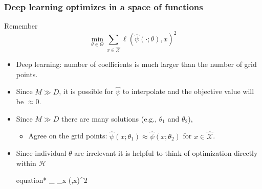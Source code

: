 \documentclass[aspectratio=169,10pt]{beamer}
\newcommand{\Xdom}{\mathcal{X}}
\newcommand{\Xtrain}{\hat{\mathcal{X}}}
\begin{document}
\begin{frame}
	\frametitle{Deep learning optimizes in a space of functions}
		Remember 
	$$
	\min_{\theta \in \Theta} \sum_{x \in \Xtrain} \ell(\hat{\psi}(\cdot;\theta),x)^2
	$$
	\begin{itemize}
		\item Deep learning: number of coefficients is much larger than the number of grid points.\vspace{0.1in} 
		\item Since $M \gg D$, it is possible for $\hat{\psi}$ to interpolate and the objective value will be $\approx 0$.
		\vspace{0.1in}
		\item Since $M \gg D$ there are many solutions (e.g., $\theta_1$ and $\theta_2$),\vspace{0.1in}
		\begin{itemize}
			\item Agree on the grid points: $\hat{\psi}(x;\theta_1) \approx \hat{\psi}(x;\theta_2)$ for $x \in \Xtrain$.\smallskip
		\end{itemize}
		\medskip
		\item Since individual $\theta$ are irrelevant it is helpful to think of optimization directly within $\mathcal{H}$
		\begin{empheq}[box=\tcbhighmath]{equation*}
			\min_{\hat{\psi} \in {}} \sum_{x \in \Xtrain} \ell(\hat{\psi},x)^2\label{eq:functional-optimization}
		\end{empheq}
	\end{itemize}
\end{frame}
\end{document}
